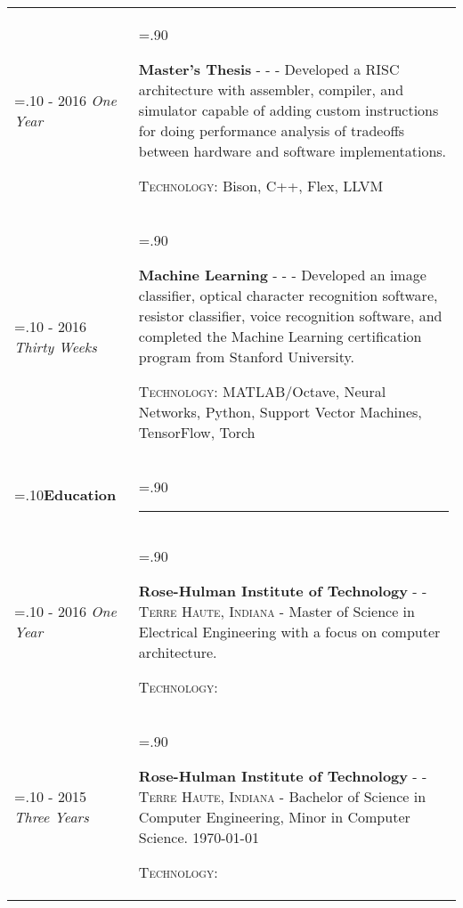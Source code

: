 \documentclass[10pt]{article}
\newcommand{\timeFrame}[3] {
  \if\relax\detokenize{#2}\relax
    #1
  \else
    #1 - #2
  \fi
  \newline
  \scriptsize \textit{#3}
}
\newcommand{\entry}[6] {
  \textbf{#1}
  \if\relax\detokenize{#2}\relax
  \else
       - \textsc{#2}
  \fi
  \if\relax\detokenize{#3}\relax
  \else
      - \textsc{#3}
  \fi
  \if\relax\detokenize{#4}\relax
  \else
      - \href{https://#4}{#4}
  \fi
  \newline #5
  \if\relax\detokenize{#6}\relax
  \else
      \newline \textsc{Technology:} #6
  \fi
  \\
}
\newcommand{\horizontalLine}[0] {
    \noindent\rule{.90\linewidth}{0.4pt}
}
\begin{document}
\begin{tabularx}{\linewidth}{>{\hsize=.10\hsize}X>{\hsize=.90\hsize}X}
\timeFrame{2015}{2016}{One Year} &
\entry{Master's Thesis}
  {}
  {}
  {}
  {
  Developed a RISC architecture with assembler, compiler, and simulator capable of adding custom instructions for doing performance analysis of tradeoffs between hardware and software implementations.
  }
  {Bison, C++, Flex, LLVM}

\timeFrame{2015}{2016}{Thirty Weeks} &
\entry{Machine Learning}
  {}
  {}
  {}
  {
  Developed an image classifier, optical character recognition software, resistor classifier, voice recognition software, and completed the Machine Learning certification program from Stanford University.
  }
  {MATLAB/Octave, Neural Networks, Python, Support Vector Machines, TensorFlow, Torch}

\textbf{Education} & \horizontalLine \\

\timeFrame{2015}{2016}{One Year} &
\entry{Rose-Hulman Institute of Technology}
  {}
  {Terre Haute, Indiana}
  {}
  {
  Master of Science in Electrical Engineering with a focus on computer architecture.
  }
  {}

\timeFrame{2012}{2015}{Three Years} &
\entry{Rose-Hulman Institute of Technology}
  {}
  {Terre Haute, Indiana}
  {}
  {
  Bachelor of Science in Computer Engineering, Minor in Computer Science. \hfill \today
  }
  {}

\end{tabularx}
\end{document}
